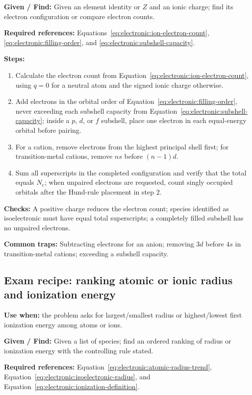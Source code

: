 \textbf{Given / Find:} Given an element identity or \(Z\) and an ionic charge; find its electron configuration or compare electron counts.

\textbf{Required references:} Equations~\eqref{eq:electronic:ion-electron-count}, \eqref{eq:electronic:filling-order}, and \eqref{eq:electronic:subshell-capacity}.

\textbf{Steps:}
\begin{enumerate}
    \item Calculate the electron count from Equation~\eqref{eq:electronic:ion-electron-count}, using \(q=0\) for a neutral atom and the signed ionic charge otherwise.
    \item Add electrons in the orbital order of Equation~\eqref{eq:electronic:filling-order}, never exceeding each subshell capacity from Equation~\eqref{eq:electronic:subshell-capacity}; inside a \(p\), \(d\), or \(f\) subshell, place one electron in each equal-energy orbital before pairing.
    \item For a cation, remove electrons from the highest principal shell first; for transition-metal cations, remove \(ns\) before \((n-1)d\).
    \item Sum all superscripts in the completed configuration and verify that the total equals \(N_e\); when unpaired electrons are requested, count singly occupied orbitals after the Hund-rule placement in step 2.
\end{enumerate}

\textbf{Checks:} A positive charge reduces the electron count; species identified as isoelectronic must have equal total superscripts; a completely filled subshell has no unpaired electrons.

\textbf{Common traps:} Subtracting electrons for an anion; removing \(3d\) before \(4s\) in transition-metal cations; exceeding a subshell capacity.

\subsection{Exam recipe: ranking atomic or ionic radius and ionization energy}
\textbf{Use when:} the problem asks for largest/smallest radius or highest/lowest first ionization energy among atoms or ions.

\textbf{Given / Find:} Given a list of species; find an ordered ranking of radius or ionization energy with the controlling rule stated.

\textbf{Required references:} Equation~\eqref{eq:electronic:atomic-radius-trend}, Equation~\eqref{eq:electronic:isoelectronic-radius}, and Equation~\eqref{eq:electronic:ionization-definition}.

